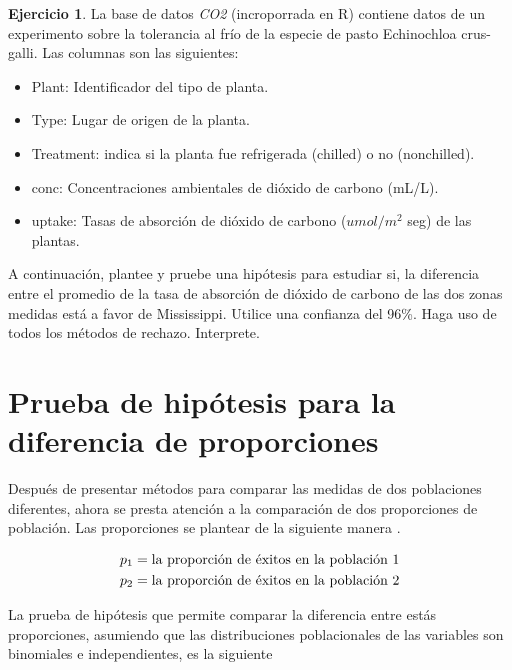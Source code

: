 \documentclass[
  11pt,
]{book}
\providecommand{\tightlist}{%
  \setlength{\itemsep}{0pt}\setlength{\parskip}{0pt}}
\theoremstyle{definition}
\theoremstyle{definition}
\theoremstyle{definition}
\newtheorem{exercise}{Ejercicio}[chapter]
\theoremstyle{definition}
\theoremstyle{remark}
\begin{document}
\begin{exercise}
La base de datos \emph{CO2} (incroporrada en R) contiene datos de un experimento sobre la tolerancia al frío de la especie de pasto Echinochloa crus-galli. Las columnas son las siguientes:

\begin{itemize}
\tightlist
\item
  Plant: Identificador del tipo de planta.
\item
  Type: Lugar de origen de la planta.
\item
  Treatment: indica si la planta fue refrigerada (chilled) o no (nonchilled).
\item
  conc: Concentraciones ambientales de dióxido de carbono (mL/L).
\item
  uptake: Tasas de absorción de dióxido de carbono (\(umol/m^2\) seg) de las plantas.
\end{itemize}

A continuación, plantee y pruebe una hipótesis para estudiar si, la diferencia entre el promedio de la tasa de absorción de dióxido de carbono de las dos zonas medidas está a favor de Mississippi. Utilice una confianza del 96\%. Haga uso de todos los métodos de rechazo. Interprete.
\end{exercise}

\section{Prueba de hipótesis para la diferencia de proporciones}\label{prueba-de-hipotesis-diferencia-proporciones}

Después de presentar métodos para comparar las medidas de dos poblaciones diferentes, ahora se presta atención a la comparación de dos proporciones de población. Las proporciones se plantear de la siguiente manera \citep[página 353]{Devore}.

\begin{equation}
\notag
\begin{split}
p_1 &= \text{la proporción de éxitos en la población 1}\\
p_2 &= \text{la proporción de éxitos en la población 2}\\
\end{split}
\end{equation}

La prueba de hipótesis que permite comparar la diferencia entre estás proporciones, asumiendo que las distribuciones poblacionales de las variables son binomiales e independientes, es la siguiente
\end{document}
